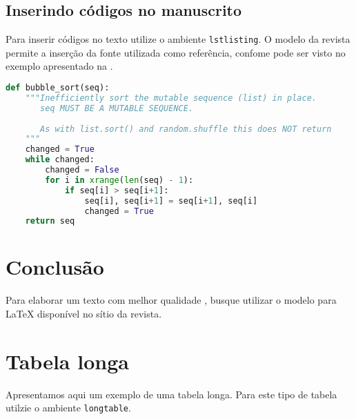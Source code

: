\documentclass{textolivre}
\begin{document}
\lipsum[10-14]



\subsection{Inserindo códigos no manuscrito}\label{sec-codigos}
Para inserir códigos no texto utilize o ambiente \texttt{lstlisting}. 
O modelo da revista permite a inserção da fonte utilizada como referência, confome 
pode ser visto no exemplo apresentado na .
 
\begin{lstlisting}[language=python, label=lst-code, caption={\textit{Bubble sort}, ou ordenação por flutuação.}, source={Rosetta Code (\url{https://rosettacode.org/wiki/Sorting_algorithms/Bubble_sort}).}]
def bubble_sort(seq):
    """Inefficiently sort the mutable sequence (list) in place.
       seq MUST BE A MUTABLE SEQUENCE.
 
       As with list.sort() and random.shuffle this does NOT return 
    """
    changed = True
    while changed:
        changed = False
        for i in xrange(len(seq) - 1):
            if seq[i] > seq[i+1]:
                seq[i], seq[i+1] = seq[i+1], seq[i]
                changed = True
    return seq
\end{lstlisting} %



\lipsum[20-21]


\section{Conclusão}\label{sec-conclusao}
Para elaborar um texto com melhor qualidade \cite{donaldknuth1984,leslielamport1994,araujo2020}, busque utilizar o modelo para \LaTeX{} 
disponível no sítio da revista.

\lipsum[17-19]



\printbibliography\label{sec-bib}

\appendix 
\section{Tabela longa}\label{apx-longtable}
Apresentamos aqui um exemplo de uma tabela longa. Para este tipo de tabela utilzie o ambiente \texttt{longtable}.
\end{document}

